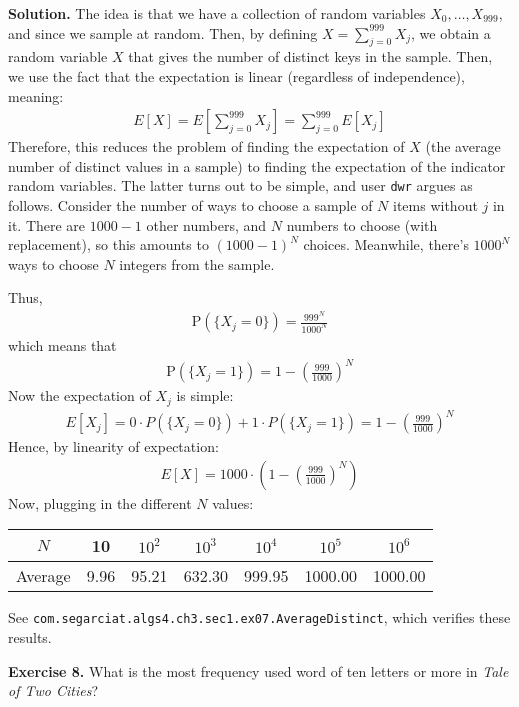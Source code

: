 \documentclass[12pt, a4paper]{article}
\newcommand{\prob}{\text{P}}
\newenvironment{ex}[2][Exercise]
{\par\medskip\noindent \textbf{#1 #2.}}
{\medskip}
\newenvironment{sol}[1][Solution]
{\par\medskip\noindent \textbf{#1.} }
{\medskip}
\begin{document}
\begin{sol}
		The idea is that we have a collection of random variables $X_0,\ldots,X_{999}$,
		and since we sample at random. Then, by defining
		$X=\sum_{j=0}^{999}X_j$, we obtain a random variable $X$ that gives
		the number of distinct keys in the sample. Then, we use the fact that
		the expectation is linear (regardless of independence), meaning:
		\begin{align*}
			E[X] = E\left[\sum_{j=0}^{999}X_j\right]=\sum_{j=0}^{999}E[X_j]
		\end{align*}
		Therefore, this reduces the problem of finding the expectation of $X$
		(the average number of distinct values in a sample) to finding the
		expectation of the indicator random variables. The latter turns out
		to be simple, and user \texttt{dwr} argues as follows. Consider
		the number of ways to choose a sample of $N$ items without $j$ in it.
		There are $1000-1$ other numbers, and $N$ numbers to choose (with replacement),
		so this amounts to $(1000-1)^N$ choices. Meanwhile, there's $1000^N$ ways to
		choose $N$ integers from the sample.
		
		Thus,
		\begin{align*}
			\prob(\{X_j=0\})=\frac{999^N}{1000^N}
		\end{align*}
		which means that
		\begin{align*}
			\prob(\{X_j=1\})=1-\left(\frac{999}{1000}\right)^N
		\end{align*}
		Now the expectation of $X_j$ is simple:
		\begin{align*}
			E[X_j]=0\cdot P(\{X_j=0\}) + 1\cdot P(\{X_j=1\})=1-\left(\frac{999}{1000}\right)^N
		\end{align*}
		Hence, by linearity of expectation:
		\begin{align*}
			E[X]=1000\cdot \left(1-\left(\frac{999}{1000}\right)^N\right)
		\end{align*}
		Now, plugging in the different $N$ values:
		\begin{center}
			\begin{tabular}{c|cccccc}
				$N$ & 10 & $10^2$ & $10^3$ & $10^4$ & $10^5$ & $10^6$ \\
				\hline
				Average & 9.96 & 95.21 & 632.30 & 999.95 & 1000.00 & 1000.00
			\end{tabular}
		\end{center}
		See \texttt{com.segarciat.algs4.ch3.sec1.ex07.AverageDistinct}, which
		verifies these results.
	\end{sol}
	\begin{ex}{8}
		What is the most frequency used word of ten letters or more in \emph{Tale of Two Cities}?
	\end{ex}
\end{document}
